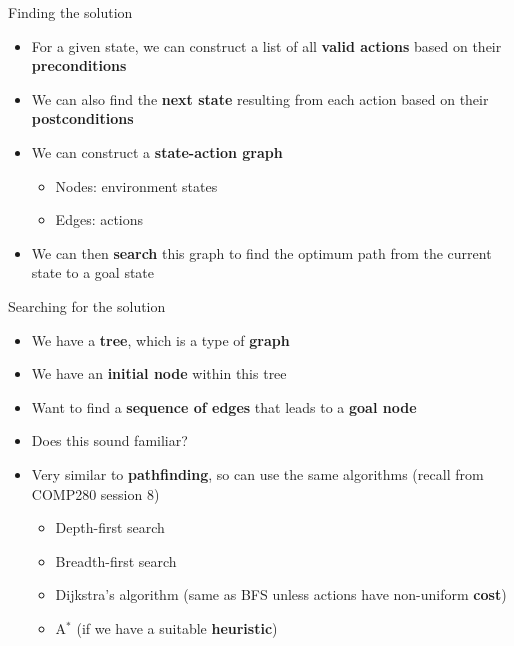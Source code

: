 \begin{frame}{Finding the solution}
	\begin{itemize}
		\pause\item For a given state, we can construct a list of all \textbf{valid actions}
			based on their \textbf{preconditions}
		\pause\item We can also find the \textbf{next state} resulting from each action
			based on their \textbf{postconditions}
		\pause\item We can construct a \textbf{state-action graph}
		\begin{itemize}
			\pause\item Nodes: environment states
			\pause\item Edges: actions
		\end{itemize}
		\pause\item We can then \textbf{search} this graph to find the optimum path from the current state to a goal state
	\end{itemize}
\end{frame}

\begin{frame}{Searching for the solution}
	\begin{itemize}
		\pause\item We have a \textbf{tree}, which is a type of \textbf{graph}
		\pause\item We have an \textbf{initial node} within this tree
		\pause\item Want to find a \textbf{sequence of edges} that leads to a \textbf{goal node}
		\pause\item Does this sound familiar?
		\pause\item Very similar to \textbf{pathfinding}, so can use the same algorithms (recall from COMP280 session 8)
		\begin{itemize}
			\pause\item Depth-first search
			\pause\item Breadth-first search
			\pause\item Dijkstra's algorithm (same as BFS unless actions have non-uniform \textbf{cost})
			\pause\item A$^*$ (if we have a suitable \textbf{heuristic})
		\end{itemize}
	\end{itemize}
\end{frame}
